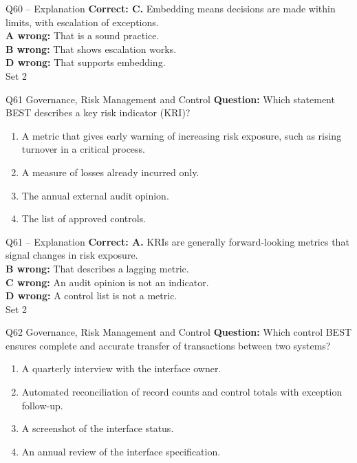 \documentclass[aspectratio=169,10pt]{beamer}
\begin{document}
\begin{frame}[t]{Q60 -- Explanation}
	\footnotesize
	\textbf{Correct: C.} Embedding means decisions are made within limits, with escalation of exceptions. \\[5pt]
\textbf{A wrong:} That is a sound practice. \\[3pt]
\textbf{B wrong:} That shows escalation works. \\[3pt]
\textbf{D wrong:} That supports embedding. \\[3pt]
	\vfill {\tiny Set 2}
\end{frame}

\begin{frame}[t]{Q61 \hfill {\scriptsize Governance, Risk Management and Control}}
	\small
	\textbf{Question:} Which statement BEST describes a key risk indicator (KRI)?
	\begin{enumerate}[label=\Alph*.,itemsep=1pt,topsep=3pt]
			\item A metric that gives early warning of increasing risk exposure, such as rising turnover in a critical process.
			\item A measure of losses already incurred only.
			\item The annual external audit opinion.
			\item The list of approved controls.
	\end{enumerate}
\end{frame}

\begin{frame}[t]{Q61 -- Explanation}
	\footnotesize
	\textbf{Correct: A.} KRIs are generally forward-looking metrics that signal changes in risk exposure. \\[5pt]
\textbf{B wrong:} That describes a lagging metric. \\[3pt]
\textbf{C wrong:} An audit opinion is not an indicator. \\[3pt]
\textbf{D wrong:} A control list is not a metric. \\[3pt]
	\vfill {\tiny Set 2}
\end{frame}

\begin{frame}[t]{Q62 \hfill {\scriptsize Governance, Risk Management and Control}}
	\small
	\textbf{Question:} Which control BEST ensures complete and accurate transfer of transactions between two systems?
	\begin{enumerate}[label=\Alph*.,itemsep=1pt,topsep=3pt]
			\item A quarterly interview with the interface owner.
			\item Automated reconciliation of record counts and control totals with exception follow-up.
			\item A screenshot of the interface status.
			\item An annual review of the interface specification.
	\end{enumerate}
\end{frame}
\end{document}
